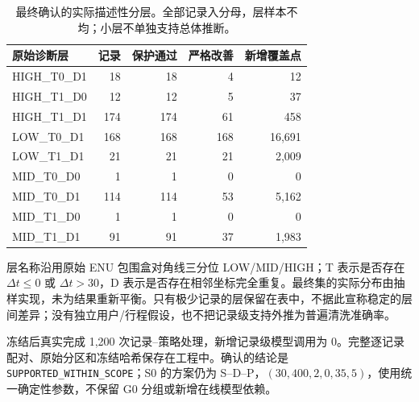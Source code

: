 \begin{table}[H]\centering\small
\caption{最终确认的实际描述性分层。全部记录入分母，层样本不均；小层不单独支持总体推断。}
\begin{tabularx}{\linewidth}{@{}Yrrrr@{}}\toprule 原始诊断层 & 记录 & 保护通过 & 严格改善 & 新增覆盖点 \\ \midrule
HIGH\_T0\_D1 & 18 & 18 & 4 & 12 \\
HIGH\_T1\_D0 & 12 & 12 & 5 & 37 \\
HIGH\_T1\_D1 & 174 & 174 & 61 & 458 \\
LOW\_T0\_D1 & 168 & 168 & 168 & 16,691 \\
LOW\_T1\_D1 & 21 & 21 & 21 & 2,009 \\
MID\_T0\_D0 & 1 & 1 & 0 & 0 \\
MID\_T0\_D1 & 114 & 114 & 53 & 5,162 \\
MID\_T1\_D0 & 1 & 1 & 0 & 0 \\
MID\_T1\_D1 & 91 & 91 & 37 & 1,983 \\
\bottomrule\end{tabularx}\end{table}
层名称沿用原始 ENU 包围盒对角线三分位 LOW/MID/HIGH；T 表示是否存在 $\Delta t\le0$ 或 $\Delta t>30$，D 表示是否存在相邻坐标完全重复。最终集的实际分布由抽样实现，未为结果重新平衡。只有极少记录的层保留在表中，不据此宣称稳定的层间差异；没有独立用户/行程假设，也不把记录级支持外推为普遍清洗准确率。

冻结后真实完成 1,200 次记录--策略处理，新增记录级模型调用为 0。完整逐记录配对、原始分区和冻结哈希保存在工程中。确认的结论是 \texttt{SUPPORTED\_WITHIN\_SCOPE}；S0 的方案仍为 S--D--P，$(30,400,2,0,35,5)$，使用统一确定性参数，不保留 G0 分组或新增在线模型依赖。
